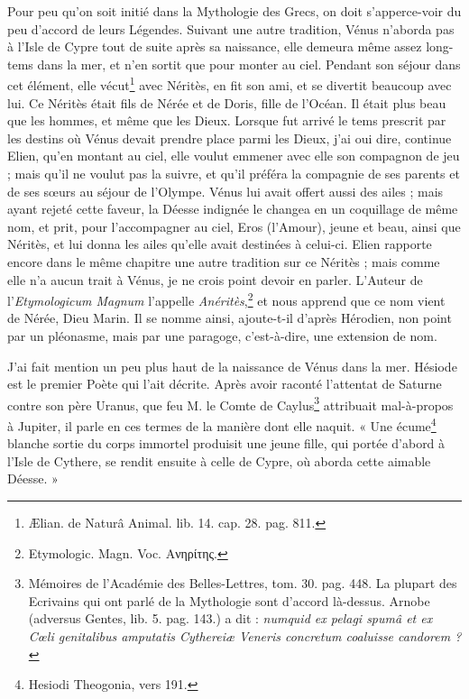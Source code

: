 \documentclass[a4paper, 18pt, oneside]{article}
\begin{document}
Pour peu qu'on soit initié dans la Mythologie des Grecs, on doit s'apperce-voir du peu d'accord de leurs Légendes. Suivant une autre tradition, Vénus n'aborda pas à l'Isle de Cypre tout de suite après sa naissance, elle demeura même assez long-tems dans la mer, et n'en sortit que pour monter au ciel. Pendant son séjour dans cet élément, elle vécut\footnote{Ælian. de Naturâ Animal. lib. 14. cap. 28. pag. 811.} avec Néritès, en fit son ami, et se divertit beaucoup avec lui. Ce Néritès était fils de Nérée et de Doris, fille de l'Océan. Il était plus beau que les hommes, et même que les Dieux. Lorsque fut arrivé le tems prescrit par les destins où Vénus devait prendre place parmi les Dieux, j'ai oui dire, continue Elien, qu'en montant au ciel, elle voulut emmener avec elle son compagnon de jeu ; mais qu'il ne voulut pas la suivre, et qu'il préféra la compagnie de ses parents et de ses sœurs au séjour de l'Olympe. Vénus lui avait offert aussi des ailes ; mais ayant rejeté cette faveur, la Déesse indignée le changea en un coquillage de même nom, et prit, pour l'accompagner au ciel, Eros (l'Amour), jeune et beau, ainsi que Néritès, et lui donna les ailes qu'elle avait destinées à celui-ci. Elien rapporte encore dans le même chapitre une autre tradition sur ce Néritès ; mais comme elle n'a aucun trait à Vénus, je ne crois point devoir en parler. L'Auteur de l'\emph{Etymologicum Magnum} l'appelle \emph{Anéritès},\footnote{Etymologic. Magn. Voc. Ανηρίτης.} et nous apprend que ce nom vient de Nérée, Dieu Marin. Il se nomme ainsi, ajoute-t-il d'après Hérodien, non point par un pléonasme, mais par une paragoge, c'est-à-dire, une extension de nom.

J'ai fait mention un peu plus haut de la naissance de Vénus dans la mer. Hésiode est le premier Poète qui l'ait décrite. Après avoir raconté l'attentat de Saturne contre son père Uranus, que feu M. le Comte de Caylus\footnote{Mémoires de l'Académie des Belles-Lettres, tom. 30. pag. 448. La plupart des Ecrivains qui ont parlé de la Mythologie sont d'accord là-dessus. Arnobe (adversus Gentes, lib. 5. pag. 143.) a dit : \emph{numquid ex pelagi spumâ et ex Cœli genitalibus amputatis Cythereiæ Veneris concretum coaluisse candorem ?}} attribuait mal-à-propos à Jupiter, il parle en ces termes de la manière dont elle naquit. « Une écume\footnote{Hesiodi Theogonia, vers 191.} blanche sortie du corps immortel produisit une jeune fille, qui portée d'abord à l'Isle de Cythere, se rendit ensuite à celle de Cypre, où aborda cette aimable Déesse. »
\end{document}
